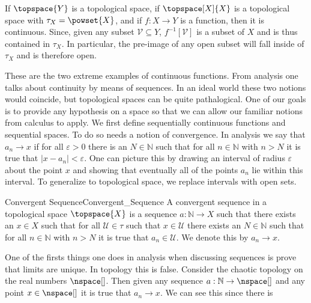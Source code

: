         \begin{example}
            If $\topspace{Y}$ is a topological space, if $\topspace[X]{X}$ is a
            topological space with $\tau_{X}=\powset{X}$, and if
            $f:X\rightarrow{Y}$ is a function, then it is continuous. Since,
            given any subset $\mathcal{V}\subseteq{Y}$,
            $f^{\minus{1}}[\mathcal{V}]$ is a subset of $X$ and is thus
            contained in $\tau_{X}$. In particular, the pre-image of any open
            subset will fall inside of $\tau_{X}$ and is therefore open.
        \end{example}
        These are the two extreme examples of continuous functions. From
        analysis one talks about continuity by means of sequences. In an
        ideal world these two notions would coincide, but topological spaces
        can be quite pathalogical. One of our goals is to provide any
        hypothesis on a space so that we can allow our familiar notions from
        calculus to apply. We first define sequentially continuous functions
        and sequential spaces. To do so needs a notion of convergence. In
        analysis we say that $a_{n}\rightarrow{x}$ if for all
        $\varepsilon>0$ there is an $N\in\mathbb{N}$ such that for all
        $n\in\mathbb{N}$ with $n>N$ it is true that $|x-a_{n}|<\varepsilon$.
        One can picture this by drawing an interval of radius $\varepsilon$
        about the point $x$ and showing that eventually all of the points
        $a_{n}$ lie within this interval. To generalize to topological
        space, we replace intervals with open sets.
        \begin{fdefinition}{Convergent Sequence}{Convergent_Sequence}
            A convergent sequence in a topological space $\topspace{X}$ is a
            sequence $a:\mathbb{N}\rightarrow{X}$ such that there exists an
            $x\in{X}$ such that for all $\mathcal{U}\in\tau$ such that
            $x\in\mathcal{U}$ there exists an $N\in\mathbb{N}$ such that for
            all $n\in\mathbb{N}$ with $n>N$ it is true that
            $a_{n}\in\mathcal{U}$. We denote this by $a_{n}\rightarrow{x}$.
        \end{fdefinition}
        One of the firsts things one does in analysis when discussing
        sequences is prove that limits are unique. In topology this is
        false. Consider the chaotic topology on the real numbers
        $\nspace[]$. Then given any sequence
        $a:\mathbb{N}\rightarrow\nspace[]$ and any point $x\in\nspace[]$ it
        is true that $a_{n}\rightarrow{x}$. We can see this since there is
